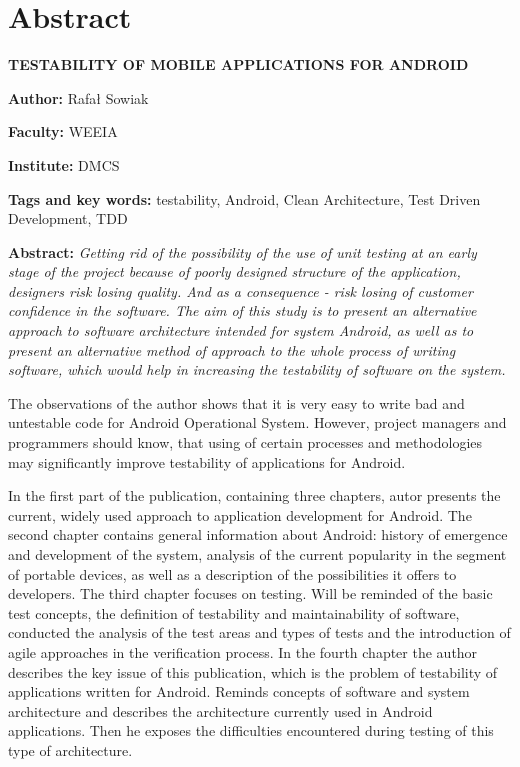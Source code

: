 \chapter*{Abstract}
\label{abstract}

\textbf{TESTABILITY OF MOBILE APPLICATIONS FOR ANDROID}

\vspace{20pt}

\textbf{Author:} Rafał Sowiak

\textbf{Faculty:} WEEIA

\textbf{Institute:} DMCS

\textbf{Tags and key words:} testability, Android, Clean Architecture, Test Driven Development, TDD

\textbf{Abstract:} 
\textit{Getting rid of the possibility of the use of unit testing at an early stage of the project because of poorly designed structure of the application, designers risk losing quality. And as a consequence - risk losing of customer confidence in the software. The aim of this study is to present an alternative approach to software architecture intended for system Android, as well as to present an alternative method of approach to the whole process of writing software, which would help in increasing the testability of software on the system.}

The observations of the author shows that it is very easy to write bad and untestable code for Android Operational System. However, project managers and programmers should know, that using of certain processes and methodologies may significantly improve testability of applications for Android.

In the first part of the publication, containing three chapters, autor presents the current, widely used approach to application development for Android. The second chapter contains general information about Android: history of emergence and development of the system, analysis of the current popularity in the segment of portable devices, as well as a description of the possibilities it offers to developers. The third chapter focuses on testing. Will be reminded of the basic test concepts, the definition of testability and maintainability of software, conducted the analysis of the test areas and types of tests and the introduction of agile approaches in the verification process. In the fourth chapter the author describes the key issue of this publication, which is the problem of testability of applications written for Android. Reminds concepts of software and system architecture and describes the architecture currently used in Android applications. Then he exposes the difficulties encountered during testing of this type of architecture.

